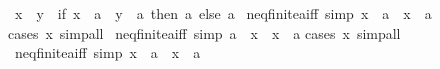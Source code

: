 \begin{isabellebody}
\isamarkupfalse%
\ {\isachardoublequoteopen}x\ {\isasymsqunion}\ y\ {\isacharequal}{\kern0pt}\ {\isacharparenleft}{\kern0pt}if\ x\ {\isacharequal}{\kern0pt}\ a\ {\isasymor}\ y\ {\isacharequal}{\kern0pt}\ a\ then\ a\ else\ a\isanewline
\isanewline
{}\isamarkupfalse%
\ neq{\isacharunderscore}{\kern0pt}finite{\isacharunderscore}{\kern0pt}{}{\isacharunderscore}{\kern0pt}aiff\ {\isacharbrackleft}{\kern0pt}simp{\isacharbrackright}{\kern0pt}{\isacharcolon}{\kern0pt}\ {\isachardoublequoteopen}x\ {\isasymnoteq}\ a\ {\isasymlongleftrightarrow}\ x\ {\isacharequal}{\kern0pt}\ a\isanewline
%
\isadelimproof
%
\endisadelimproof
%
\isatagproof
{}\isamarkupfalse%
{\isacharparenleft}{\kern0pt}cases\ x{\isacharparenright}{\kern0pt}\ simp{\isacharunderscore}{\kern0pt}all%
\endisatagproof
{\isafoldproof}%
%
\isadelimproof
\isanewline
%
\endisadelimproof
\isanewline
{}\isamarkupfalse%
\ neq{\isacharunderscore}{\kern0pt}finite{\isacharunderscore}{\kern0pt}{}{\isacharunderscore}{\kern0pt}aiff{\isacharprime}{\kern0pt}\ {\isacharbrackleft}{\kern0pt}simp{\isacharbrackright}{\kern0pt}{\isacharcolon}{\kern0pt}\ {\isachardoublequoteopen}a\ {\isasymnoteq}\ x\ {\isasymlongleftrightarrow}\ x\ {\isacharequal}{\kern0pt}\ a\isanewline
%
\isadelimproof
%
\endisadelimproof
%
\isatagproof
{}\isamarkupfalse%
{\isacharparenleft}{\kern0pt}cases\ x{\isacharparenright}{\kern0pt}\ simp{\isacharunderscore}{\kern0pt}all%
\endisatagproof
{\isafoldproof}%
%
\isadelimproof
\isanewline
%
\endisadelimproof
\isanewline
{}\isamarkupfalse%
\ neq{\isacharunderscore}{\kern0pt}finite{\isacharunderscore}{\kern0pt}{}{\isacharunderscore}{\kern0pt}aiff\ {\isacharbrackleft}{\kern0pt}simp{\isacharbrackright}{\kern0pt}{\isacharcolon}{\kern0pt}\ {\isachardoublequoteopen}x\ {\isasymnoteq}\ a\ {\isasymlongleftrightarrow}\ x\ {\isacharequal}{\kern0pt}\ a\isanewline
%
\isadelimproof
%
\endisadelimproof
%
\isatagproof
{}\isamarkupfalse%

\end{isabellebody}
